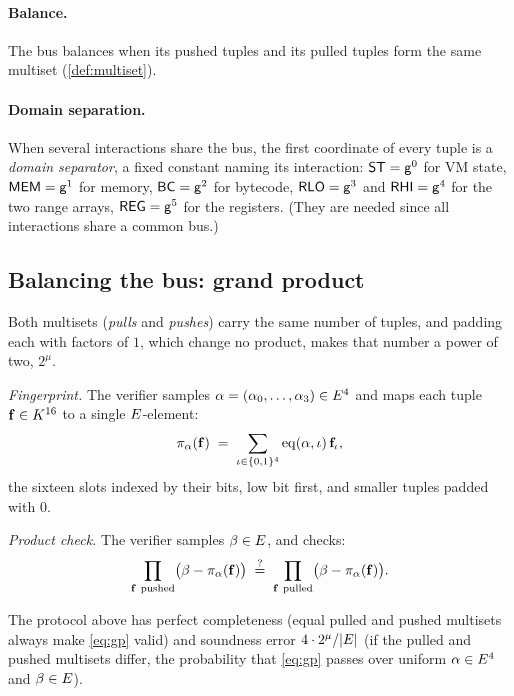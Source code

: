 \paragraph{Balance.} The bus balances when its pushed tuples and its pulled tuples form the same multiset (\ref{def:multiset}).

\paragraph{Domain separation.} When several interactions share the bus, the first coordinate of every tuple is a \emph{domain separator}, a fixed constant naming its interaction: $\mathsf{ST}=\mathsf{g}^{0}$ for VM state, $\mathsf{MEM}=\mathsf{g}^{1}$ for memory, $\mathsf{BC}=\mathsf{g}^{2}$ for bytecode, $\mathsf{RLO}=\mathsf{g}^{3}$ and $\mathsf{RHI}=\mathsf{g}^{4}$ for the two range arrays, $\mathsf{REG}=\mathsf{g}^{5}$ for the registers. (They are needed since all interactions share a common bus.)

\subsection{Balancing the bus: grand product}\label{sec:gp}

Both multisets (\emph{pulls} and \emph{pushes}) carry the same number of tuples, and padding each with factors of $1$, which change no product, makes that number a power of two, $2^{\mu}$.

\emph{Fingerprint.} The verifier samples $\alpha=(\alpha_0,\dots,\alpha_3)\in E^{4}$ and maps each tuple $\mathbf{f} \in K^{16}$ to a single $E$-element:
\[
\pi_\alpha(\mathbf{f})\;=\;\sum_{\iota\in\{0,1\}^{4}}\operatorname{eq}(\alpha,\iota)\,\mathbf{f}_\iota ,
\]
the sixteen slots indexed by their bits, low bit first, and smaller tuples padded with $0$.

\emph{Product check.} The verifier samples $\beta\in E$, and checks:
\begin{equation}
\prod_{\btup\ \text{pushed}}\bigl(\beta-\pi_\alpha(\btup)\bigr)
\;\qeq\;
\prod_{\btup\ \text{pulled}}\bigl(\beta-\pi_\alpha(\btup)\bigr).
\label{eq:gp}
\end{equation}

\begin{theorem}\label{th:product_check}
  The protocol above has perfect completeness (equal pulled and pushed multisets always make \eqref{eq:gp} valid) and soundness error $4\cdot 2^{\mu}/|E|$ (if the pulled and pushed multisets differ, the probability that \eqref{eq:gp} passes over uniform $\alpha \in E^{4}$ and $\beta \in E$).
\end{theorem}

